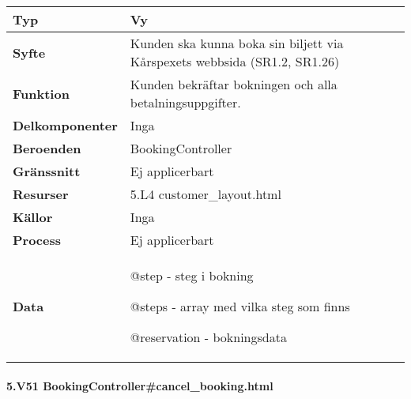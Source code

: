 \documentclass[a4paper, twoside, 11pt, titlepage]{article}
\begin{document}
			\begin {table} [ht] \begin{tabular} {  p{3.5cm} p{11.6cm} }
				\hline
				{\sffamily\textbf{Typ}} & {Vy} \\
				\hline
				{\sffamily\textbf{Syfte}} & {Kunden ska kunna boka sin biljett via Kårspexets webbsida (SR1.2, SR1.26)} \\
				\hline
				{\sffamily\textbf{Funktion}} & {Kunden bekräftar bokningen och alla betalningsuppgifter.} \\
				\hline
				{\sffamily\textbf{Delkomponenter}} & {Inga} \\
				\hline
				{\sffamily\textbf{Beroenden}} & {BookingController} \\
				\hline
				{\sffamily\textbf{Gränssnitt}} & {Ej applicerbart} \\
				\hline
				{\sffamily\textbf{Resurser}} & {5.L4 customer\_layout.html } \\
				\hline
				{\sffamily\textbf{Källor}} & {Inga} \\
				\hline
				{\sffamily\textbf{Process}} & {Ej applicerbart} \\
				\hline
				{\sffamily\textbf{Data}} & {@step - steg i bokning

@steps - array med vilka steg som finns

@reservation - bokningsdata} \\
				\hline
			\end{tabular} \end{table} \FloatBarrier


			\paragraph{5.V51 BookingController\#cancel\_booking.html}\
\end{document}
